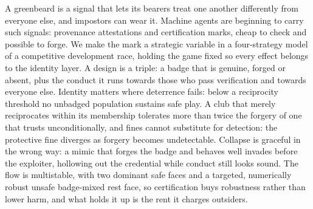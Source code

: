 \noindent
A greenbeard is a signal that lets its bearers treat one another differently
from everyone else, and impostors can wear it. Machine agents are beginning to
carry such signals: provenance attestations and certification marks, cheap to
check and possible to forge. We make the mark a strategic variable in a
four-strategy model of a competitive development race, holding the game fixed so
every effect belongs to the identity layer. A design is a triple: a badge that
is genuine, forged or absent, plus the conduct it runs towards those who pass
verification and towards everyone else. Identity matters where deterrence fails:
below a reciprocity threshold no unbadged population sustains safe play. A club
that merely reciprocates within its membership tolerates more than twice the
forgery of one that trusts unconditionally, and fines cannot substitute for
detection: the protective fine diverges as forgery becomes undetectable.
Collapse is graceful in the wrong way: a mimic that forges the badge and behaves
well invades before the exploiter, hollowing out the credential while conduct
still looks sound. The flow is multistable, with two dominant safe faces and a
targeted, numerically robust unsafe badge-mixed rest face, so
certification buys robustness rather than lower harm, and what holds it up is
the rent it charges outsiders.

